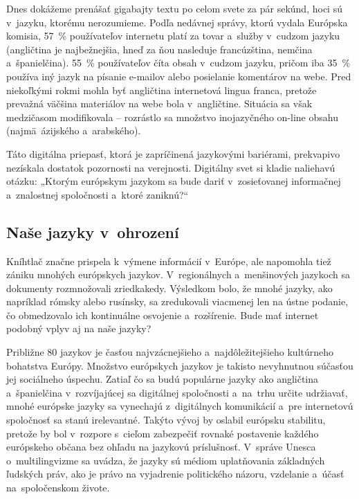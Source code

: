 \begin{multicols}{2}
Dnes dokážeme prenášať gigabajty textu po celom svete za pár
sekúnd, hoci sú v~jazyku, ktorému nerozumieme. Podľa nedávnej
správy, ktorú vydala Európska komisia, 57~\% používateľov
internetu platí za tovar a~služby v~cudzom jazyku (angličtina je
najbežnejšia, hneď za ňou nasleduje francúzština, nemčina
a~španielčina). 55~\% používateľov číta obsah v~cudzom jazyku,
pričom iba 35~\% používa iný jazyk na písanie e-mailov alebo
posielanie komentárov na webe.\cite{EC1} Pred
niekoľkými rokmi mohla byť angličtina internetová lingua franca,
pretože prevažná väčšina materiálov na webe bola v~angličtine.
Situácia sa však medzičasom modifikovala – rozrástlo sa množstvo
inojazyčného on-line obsahu (najmä~ázijského a~arabského).

Táto digitálna priepasť, ktorá je zapríčinená jazykovými
bariérami, prekvapivo nezískala dostatok pozornosti na verejnosti.
Digitálny svet si kladie naliehavú otázku: „Ktorým európskym
jazykom sa bude dariť v~zosieťovanej informačnej a~znalostnej
spoločnosti a~ktoré zaniknú?“

\subsection{Naše jazyky v~ohrození}
Kníhtlač značne prispela k~výmene informácií v~Európe, ale napomohla tiež zániku mnohých európskych jazykov. V~regionálnych a~menšinových jazykoch sa dokumenty rozmnožovali zriedkakedy. Výsledkom bolo, že mnohé jazyky, ako napríklad rómsky alebo rusínsky, sa zredukovali viacmenej len na ústne podanie, čo obmedzovalo ich kontinuálne osvojenie a~rozšírenie. Bude mať internet podobný vplyv aj na naše jazyky?


Približne 80 jazykov je časťou najvzácnejšieho a~najdôležitejšieho kultúrneho bohatstva Európy. Množstvo európskych jazykov je takisto nevyhnutnou súčasťou jej sociálneho úspechu.\cite{EC2} Zatiaľ čo sa budú populárne jazyky ako angličtina a~španielčina v~rozvíjajúcej sa digitálnej spoločnosti a~na~trhu určite udržiavať, mnohé európske jazyky sa vynechajú z~digitálnych komunikácií a~pre internetovú spoločnosť sa stanú irelevantné. Takýto vývoj by oslabil európsku stabilitu, pretože by bol v~rozpore  s~cieľom zabezpečiť rovnaké postavenie každého európskeho občana bez ohľadu na jazykovú príslušnosť. V~správe Unesca o~multilingvizme sa uvádza, že jazyky sú médiom uplatňovania základných ľudských práv, ako je právo na vyjadrenie politického názoru, vzdelanie a~účasť na~spoločenskom živote.\cite{Unesco1}


\end{multicols}
